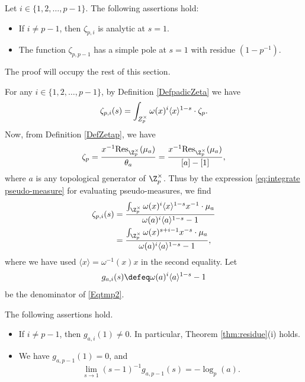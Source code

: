 \documentclass[a4paper,10pt, english, reqno]{smfart}
\numberwithin{equation}{section}
\begin{document}
\begin{theorem}\label{thm:residue}
Let $i \in \{1, 2, \ldots, p-1 \}$. The following assertions hold:
\begin{itemize}
\item[(i)] If $i \neq p-1$, then $\zeta_{p,i}$ is analytic at $s=1$.
\item[(ii)] The function $\zeta_{p,p-1}$ has a simple pole at $s=1$ with residue $(1 - p^{-1})$. 
\end{itemize}
\end{theorem}

The proof will occupy the rest of this section.


For any $i \in \{1,2, \ldots, p-1\}$, by Definition \ref{DefpadicZeta} we have
\begin{align} 
\zeta_{p, i}(s) = \int_{Z_p^\times} \omega(x)^i \langle x \rangle^{1 - s} \cdot \zeta_p. \notag
\end{align}
Now, from Definition \ref{DefZetap}, we have 
\[
    \zeta_p = \frac{x^{-1} \mathrm{Res}_{\Z_p^\times}(\mu_a)}{\theta_a} = \frac{x^{-1} \mathrm{Res}_{\Z_p^\times}(\mu_a)}{[a]-[1]},
\]
where $a$ is any topological generator of $\Z_p^\times$. Thus by the expression \eqref{eq:integrate pseudo-measure} for evaluating pseudo-measures, we find
\begin{align}
\zeta_{p,i}(s)   &= \frac{\int_{\Z_p^\times} \omega(x)^{i} \langle x\rangle ^{1-s} x^{-1} \cdot \mu_a}{\omega(a)^{i}\langle a\rangle^{1-s} - 1}\notag\\
&=\frac{\int_{\Z_p^\times} \omega(x)^{s + i - 1} x^{-s} \cdot \mu_a}{\omega(a)^{i}\langle a\rangle^{1-s} - 1},\label{Eqtmp2}
\end{align}
where we have used $\langle x\rangle  = \omega^{-1}(x)x$ in the second equality. Let \[
    g_{a,i}(s) \defeq \omega(a)^i\langle a \rangle^{1-s} - 1
\]
be the denominator of \eqref{Eqtmp2}.

\begin{lemma}\label{lem:g p-1} The following assertions hold.
\begin{itemize}
\item[(i)] If $i \neq p-1$, then $g_{a,i}(1) \neq 0$. In particular, Theorem \ref{thm:residue}(i) holds.
\item[(ii)] We have $g_{a,p-1}(1) = 0$, and 
\[
\lim_{s\to1} (s-1)^{-1}g_{a,p-1}(s) = -\log_p(a).
\]
\end{itemize}
\end{lemma}
\end{document}
